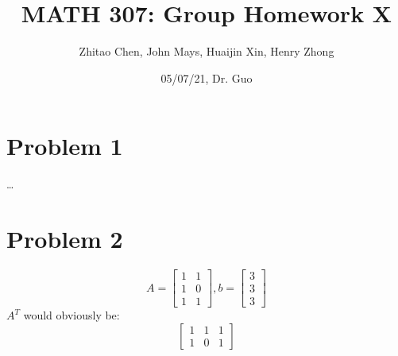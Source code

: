 \documentclass{article}
\title{\textbf{MATH 307: Group Homework X}}
\author{Zhitao Chen, John Mays, Huaijin Xin, Henry Zhong}
\date{05/07/21, Dr. Guo}
\begin{document}
\maketitle


\section*{Problem 1}
\dots
\pagebreak
\section*{Problem 2}
$$A = \begin{bmatrix}1&1\\1&0\\1&1\end{bmatrix}, b = \begin{bmatrix}3\\3\\3\end{bmatrix}$$
$A^{T}$ would obviously be:
$$\begin{bmatrix}1&1&1\\1&0&1\end{bmatrix}$$
\end{document}
